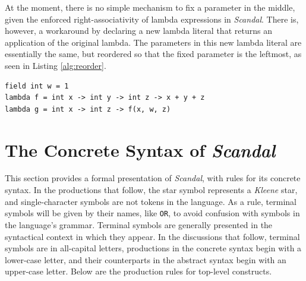 At the moment, there is no simple mechanism to fix a parameter in the middle, given the enforced right-associativity of lambda expressions in \emph{Scandal}. There is, however, a workaround by declaring a new lambda literal that returns an application of the original lambda. The parameters in this new lambda literal are essentially the same, but reordered so that the fixed parameter is the leftmost, as seen in Listing \ref{alg:reorder}.

\begin{lstlisting}[emph={field,int,lambda,print},emphstyle={\textbf},caption={Right associativity of lambda expressions.},label={alg:reorder}]
field int w = 1
lambda f = int x -> int y -> int z -> x + y + z
lambda g = int x -> int z -> f(x, w, z)
\end{lstlisting}

\section{The Concrete Syntax of \emph{Scandal}}

This section provides a formal presentation of \emph{Scandal}, with rules for its concrete syntax. In the productions that follow, the star symbol represents a \emph{Kleene} star, and single-character symbols are not tokens in the language. As a rule, terminal symbols will be given by their names, like \texttt{OR}, to avoid confusion with symbols in the language's grammar. Terminal symbols are generally presented in the syntactical context in which they appear. In the discussions that follow, terminal symbols are in all-capital letters, productions in the concrete syntax begin with a lower-case letter, and their counterparts in the abstract syntax begin with an upper-case letter. Below are the production rules for top-level constructs.

